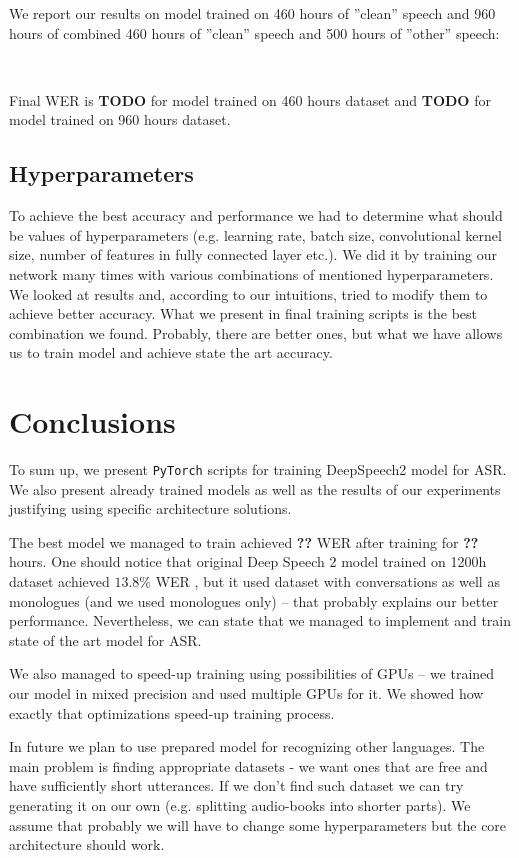 \documentclass[licencjacka,en]{pracamgr}
\newcommand{\todoplot}[1]{
\ \\
\noindent%
\begin{minipage}{\linewidth}%
\makebox[\linewidth]{%
		\begin{tikzpicture}
		\begin{axis}[
            ymin = 0, ymax = 5,
            xmin = 0, xmax = 600,
            minor y tick num = 4,
            minor x tick num = 1,
            ymajorgrids = true,
            grid style = dashed,
            scaled x ticks = false,
            xlabel = TODO,
            ylabel = TODO,
            legend pos=outer north east,
            no markers
          ]
		  \addplot table[x=epochs,y=training]{\first};
		  \addlegendentry{TODO}

		\end{axis}
		\end{tikzpicture}
		}\captionof{figure}{#1}\label{diag:time}     
\end{minipage}
}
\begin{document}
We report our results on model trained on 460 hours of ''clean'' speech and 960 hours of combined 460 hours of ''clean'' speech and 500 hours of ''other'' speech:

\todoplot{TODO}

Final WER is \textbf{TODO} for model trained on 460 hours dataset and \textbf{TODO} for model trained on 960 hours dataset.

\section{Hyperparameters}
To achieve the best accuracy and performance we had to determine what should be values of hyperparameters (e.g. learning rate, batch size, convolutional kernel size, number of features in fully connected layer etc.). We did it by training our network many times with various combinations of mentioned hyperparameters. We looked at results and, according to our intuitions, tried to modify them to achieve better accuracy. What we present in final training scripts is the best combination we found. Probably, there are better ones, but what we have allows us to train model and achieve state the art accuracy.


\chapter{Conclusions}\label{r:concls}

To sum up, we present \texttt{PyTorch} scripts for training DeepSpeech2 model for ASR. We also present already trained models as well as the results of our experiments justifying using specific architecture solutions.

The best model we managed to train achieved \textbf{??} WER after training for \textbf{??} hours. One should notice that original Deep Speech 2 model trained on 1200h dataset achieved $13.8$\% WER \cite{DS2}, but it used dataset with conversations as well as monologues (and we used monologues only) -- that probably explains our better performance. Nevertheless, we can state that we managed to implement and train state of the art model for ASR.

We also managed to speed-up training using possibilities of GPUs -- we trained our model in mixed precision and used multiple GPUs for it. We showed how exactly that optimizations speed-up training process.

In future we plan to use prepared model for recognizing other languages. The main problem is finding appropriate datasets - we want ones that are free and have sufficiently short utterances. If we don't find such dataset we can try generating it on our own (e.g. splitting audio-books into shorter parts). We assume that probably we will have to change some hyperparameters but the core architecture should work.
\end{document}
